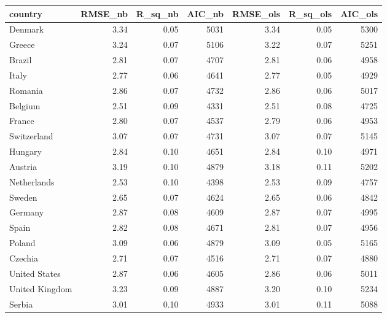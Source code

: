 \begin{table}[ht]
\centering
\begin{tabular}{lrrrrrr}
  \hline
country & RMSE\_nb & R\_sq\_nb & AIC\_nb & RMSE\_ols & R\_sq\_ols & AIC\_ols \\ 
  \hline
Denmark & 3.34 & 0.05 & 5031 & 3.34 & 0.05 & 5300 \\ 
  Greece & 3.24 & 0.07 & 5106 & 3.22 & 0.07 & 5251 \\ 
  Brazil & 2.81 & 0.07 & 4707 & 2.81 & 0.06 & 4958 \\ 
  Italy & 2.77 & 0.06 & 4641 & 2.77 & 0.05 & 4929 \\ 
  Romania & 2.86 & 0.07 & 4732 & 2.86 & 0.06 & 5017 \\ 
  Belgium & 2.51 & 0.09 & 4331 & 2.51 & 0.08 & 4725 \\ 
  France & 2.80 & 0.07 & 4537 & 2.79 & 0.06 & 4953 \\ 
  Switzerland & 3.07 & 0.07 & 4731 & 3.07 & 0.07 & 5145 \\ 
  Hungary & 2.84 & 0.10 & 4651 & 2.84 & 0.10 & 4971 \\ 
  Austria & 3.19 & 0.10 & 4879 & 3.18 & 0.11 & 5202 \\ 
  Netherlands & 2.53 & 0.10 & 4398 & 2.53 & 0.09 & 4757 \\ 
  Sweden & 2.65 & 0.07 & 4624 & 2.65 & 0.06 & 4842 \\ 
  Germany & 2.87 & 0.08 & 4609 & 2.87 & 0.07 & 4995 \\ 
  Spain & 2.82 & 0.08 & 4671 & 2.81 & 0.07 & 4956 \\ 
  Poland & 3.09 & 0.06 & 4879 & 3.09 & 0.05 & 5165 \\ 
  Czechia & 2.71 & 0.07 & 4516 & 2.71 & 0.07 & 4880 \\ 
  United States & 2.87 & 0.06 & 4605 & 2.86 & 0.06 & 5011 \\ 
  United Kingdom & 3.23 & 0.09 & 4887 & 3.20 & 0.10 & 5234 \\ 
  Serbia & 3.01 & 0.10 & 4933 & 3.01 & 0.11 & 5088 \\ 
   \hline
\end{tabular}
\end{table}
